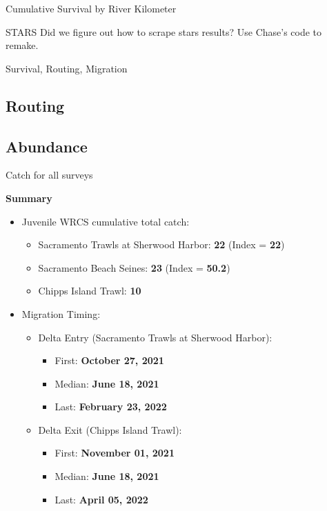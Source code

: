 \documentclass[
]{book}
\providecommand{\tightlist}{%
  \setlength{\itemsep}{0pt}\setlength{\parskip}{0pt}}
\theoremstyle{definition}
\theoremstyle{definition}
\theoremstyle{definition}
\theoremstyle{definition}
\theoremstyle{remark}
\begin{document}
\label{fig:hatcherysurvival-fig}Cumulative Survival by River Kilometer

STARS Did we figure out how to scrape stars results? Use Chase's code to remake.

Survival, Routing, Migration

\hypertarget{routing}{%
\subsection{Routing}\label{routing}}

\hypertarget{abundance}{%
\subsection{Abundance}\label{abundance}}

Catch for all surveys

\textbf{Summary}

\begin{itemize}
\tightlist
\item
  Juvenile WRCS cumulative total catch:

  \begin{itemize}
  \tightlist
  \item
    Sacramento Trawls at Sherwood Harbor: \textbf{22} (Index = \textbf{22})
  \item
    Sacramento Beach Seines: \textbf{23} (Index = \textbf{50.2})
  \item
    Chipps Island Trawl: \textbf{10}
  \end{itemize}
\item
  Migration Timing:

  \begin{itemize}
  \tightlist
  \item
    Delta Entry (Sacramento Trawls at Sherwood Harbor):

    \begin{itemize}
    \tightlist
    \item
      First: \textbf{October 27, 2021}\\
    \item
      Median: \textbf{June 18, 2021}
    \item
      Last: \textbf{February 23, 2022}
    \end{itemize}
  \item
    Delta Exit (Chipps Island Trawl):

    \begin{itemize}
    \tightlist
    \item
      First: \textbf{November 01, 2021}\\
    \item
      Median: \textbf{June 18, 2021}
    \item
      Last: \textbf{April 05, 2022}
    \end{itemize}
  \end{itemize}
\end{itemize}
\end{document}
